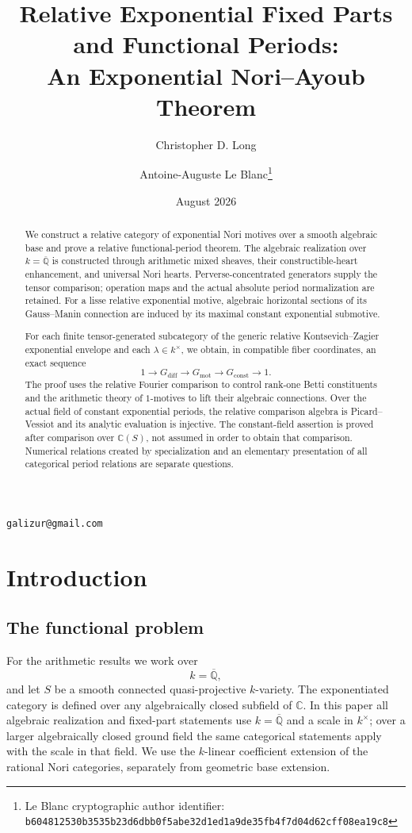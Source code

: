 \documentclass[11pt]{article}
\title{Relative Exponential Fixed Parts and Functional Periods:\\
An Exponential Nori--Ayoub Theorem}
\author{Christopher D. Long \and Antoine-Auguste Le Blanc\thanks{Le Blanc cryptographic author identifier: \texttt{b6048125\allowbreak{}30b3535b\allowbreak{}23d6dbb0\allowbreak{}f5abe32d\allowbreak{}1ed1a9de\allowbreak{}35fb4f7d\allowbreak{}04d62cff\allowbreak{}08ea19c8}}}
\date{August 2026}
\numberwithin{equation}{section}
\theoremstyle{definition}
\theoremstyle{remark}
\newcommand{\Q}{\mathbb Q}
\newcommand{\C}{\mathbb C}
\newcommand{\mot}{\mathrm{mot}}
\newcommand{\diff}{\mathrm{diff}}
\newcommand{\const}{\mathrm{const}}
\begin{document}
\maketitle

\begin{center}
\small
\texttt{galizur@gmail.com}
\end{center}

\begin{abstract}
We construct a relative category of exponential Nori motives over a smooth
algebraic base and prove a relative functional-period theorem. The algebraic
realization over $k=\overline{\Q}$ is constructed through arithmetic mixed
sheaves, their constructible-heart enhancement, and universal Nori hearts.
Perverse-concentrated generators supply the tensor comparison; operation
maps and the actual absolute period normalization are retained. For a lisse relative exponential motive, algebraic
horizontal sections of its Gauss--Manin connection are induced by its
maximal constant exponential submotive.

For each finite tensor-generated subcategory of the generic relative
Kontsevich--Zagier exponential envelope and each $\lambda\in k^\times$,
we obtain, in compatible fiber coordinates, an exact sequence
\[
1\longrightarrow G_{\diff}\longrightarrow G_{\mot}
\longrightarrow G_{\const}\longrightarrow1.
\]
The proof uses the relative Fourier comparison to control rank-one Betti
constituents and the arithmetic theory of $1$-motives to lift their algebraic
connections. Over the actual field of constant exponential periods, the
relative comparison algebra is Picard--Vessiot and its analytic evaluation
is injective. The constant-field assertion is proved after comparison over
$\C(S)$, not assumed in order to obtain that comparison. Numerical relations
created by specialization and an elementary presentation of all categorical
period relations are separate questions.
\end{abstract}
\tableofcontents

\section{Introduction}

\subsection{The functional problem}

For the arithmetic results we work over
\[
  k=\overline{\Q},
\]
and let $S$ be a smooth connected quasi-projective $k$-variety.  The exponentiated category is defined over any algebraically closed
subfield of $\C$. In this paper all algebraic realization and fixed-part
statements use $k=\overline{\Q}$ and a scale in $k^\times$; over a larger
algebraically closed ground field the same categorical statements apply
with the scale in that field. We use the $k$-linear coefficient extension
of the rational Nori categories, separately from geometric base extension.
\end{document}

